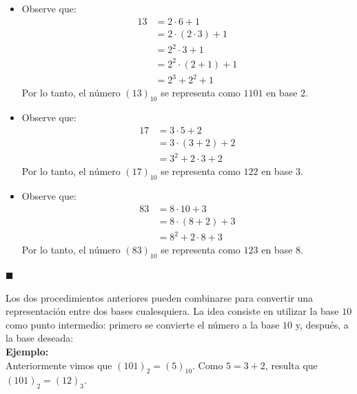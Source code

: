 \documentclass[10 pt]{article}
\begin{document}
\begin{itemize}
    \item \Large{Observe que:}
    \begin{align*}
        13&=2 \cdot 6+1 \\
        &=2 \cdot (2 \cdot 3)+1 \\
        &=2^2 \cdot 3+1 \\
        &=2^2 \cdot (2+1)+1 \\
        &=2^3+2^2+1
    \end{align*}
    \Large{Por lo tanto, el número $(13)_{10}$ se representa como $1101$ en base $2$.} \\
\end{itemize}
\begin{itemize}
    \item \Large{Observe que:}
    \begin{align*}
        17&=3 \cdot 5+2 \\
        &=3 \cdot (3+2)+2 \\
        &=3^2+2 \cdot 3+2
    \end{align*}
    \Large{Por lo tanto, el número $(17)_{10}$ se representa como $122$ en base $3$.} \\

    \item \Large{Observe que:}
    \begin{align*}
        83&=8 \cdot 10+3 \\
        &=8 \cdot (8+2)+3 \\
        &=8^2+2 \cdot 8+3
    \end{align*}
    \Large{Por lo tanto, el número $(83)_{10}$ se representa como $123$ en base $8$.} \\
\end{itemize}

\begin{flushright}
    $\blacksquare$
\end{flushright}

\Large{Los dos procedimientos anteriores pueden combinarse para convertir una representación entre dos bases cualesquiera. La idea consiste en utilizar la base $10$ como punto intermedio: primero se convierte el número a la base $10$ y, después, a la base deseada:} \\

\Large{\textbf{Ejemplo:}} \\

\Large{Anteriormente vimos que $(101)_2=(5)_{10}$. Como $5=3+2$, resulta que $(101)_2=(12)_3$.} \\
\end{document}
